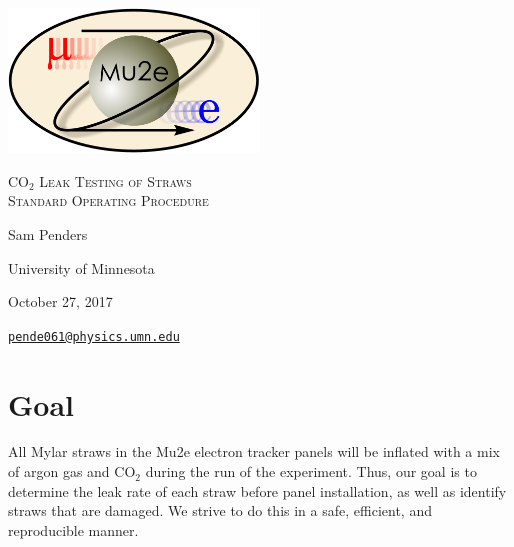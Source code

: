 \documentclass[letterpaper c,12pt]{article}
\begin{document}
\begin{titlepage}
	\centering
	\includegraphics[width=0.5\textwidth]{mu2e_logo_oval.png}\par\vspace{2cm}
	{\scshape\LARGE CO$_2$ Leak Testing of Straws \\
		Standard Operating Procedure\par}
	\vspace{3cm}
	{\Large Sam Penders\par}
	\vspace{3cm}
	{\large University of Minnesota\par}
 	\vspace{.5cm}
	{\large October 27, 2017\par}
	\vfill
	{\href{mailto:pende061@physics.umn.edu}{\tt{pende061@physics.umn.edu}}\par}
\end{titlepage}

\clearpage
\setcounter{page}{1}

\newenvironment{myitemize} %
{ \begin{itemize}
    \setlength{\itemsep}{4pt}
    \setlength{\parskip}{0pt}
    \setlength{\parsep}{0pt}     }
{ \end{itemize}                  } 

\section{Goal}
All Mylar straws in the Mu2e electron tracker panels will be inflated with a mix of argon gas and CO$_2$ during the run of the experiment. Thus, our goal is to determine the leak rate of each straw before panel installation, as well as identify straws that are damaged. We strive to do this in a safe, efficient, and reproducible manner.

\end{document}
